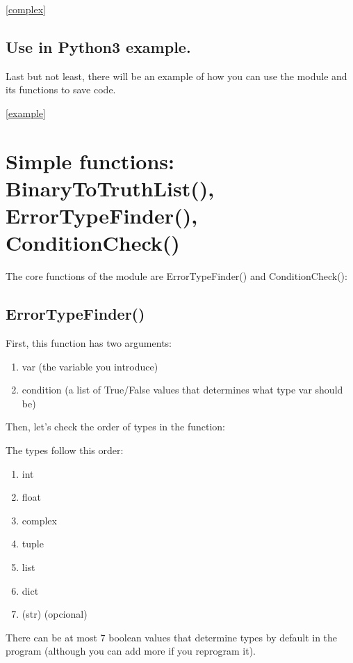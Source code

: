 \documentclass{article}
\begin{document}
	\ref{complex}
	\subsection{Use in Python3 example.}
	Last but not least, there will be an example of how you can use the module and its functions to save code.
	
	\ref{example}
	\newpage
	\section{Simple functions: BinaryToTruthList(), ErrorTypeFinder(), ConditionCheck()} 
	\label{simple}
	
	The core functions of the module are ErrorTypeFinder() and ConditionCheck():
	
	\subsection{ErrorTypeFinder()}
		
	
	\label{error_check_1}
	\newpage
	
	First, this function has two arguments:
	\begin{enumerate}
		\item var (the variable you introduce)
		\item condition (a list of True/False values that determines what type var should be)
	\end{enumerate}
	\vspace{3cm}
	
	Then, let's check the order of types in the function:
	
	
	
	The types follow this order:
	
	\begin{enumerate}
		\item int
		\item float
		\item complex
		\item tuple
		\item list
		\item dict
		\item (str) (opcional)
	\end{enumerate}
	
	There can be at most 7 boolean values that determine types by default in the program (although you can add more if you reprogram it).
	
\end{document}

